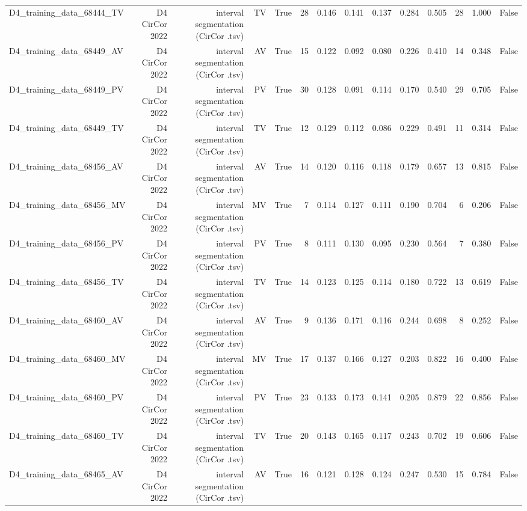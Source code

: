 \begin{table}[htbp]
\begin{tabular}{lrrrrrrrrrrrrr}
    D4\_training\_data\_68444\_TV & D4 CirCor 2022 & interval segmentation (CirCor .tsv) & TV & True & 28 & 0.146 & 0.141 & 0.137 & 0.284 & 0.505 & 28 & 1.000 & False \\
    D4\_training\_data\_68449\_AV & D4 CirCor 2022 & interval segmentation (CirCor .tsv) & AV & True & 15 & 0.122 & 0.092 & 0.080 & 0.226 & 0.410 & 14 & 0.348 & False \\
    D4\_training\_data\_68449\_PV & D4 CirCor 2022 & interval segmentation (CirCor .tsv) & PV & True & 30 & 0.128 & 0.091 & 0.114 & 0.170 & 0.540 & 29 & 0.705 & False \\
    D4\_training\_data\_68449\_TV & D4 CirCor 2022 & interval segmentation (CirCor .tsv) & TV & True & 12 & 0.129 & 0.112 & 0.086 & 0.229 & 0.491 & 11 & 0.314 & False \\
    D4\_training\_data\_68456\_AV & D4 CirCor 2022 & interval segmentation (CirCor .tsv) & AV & True & 14 & 0.120 & 0.116 & 0.118 & 0.179 & 0.657 & 13 & 0.815 & False \\
    D4\_training\_data\_68456\_MV & D4 CirCor 2022 & interval segmentation (CirCor .tsv) & MV & True & 7 & 0.114 & 0.127 & 0.111 & 0.190 & 0.704 & 6 & 0.206 & False \\
    D4\_training\_data\_68456\_PV & D4 CirCor 2022 & interval segmentation (CirCor .tsv) & PV & True & 8 & 0.111 & 0.130 & 0.095 & 0.230 & 0.564 & 7 & 0.380 & False \\
    D4\_training\_data\_68456\_TV & D4 CirCor 2022 & interval segmentation (CirCor .tsv) & TV & True & 14 & 0.123 & 0.125 & 0.114 & 0.180 & 0.722 & 13 & 0.619 & False \\
    D4\_training\_data\_68460\_AV & D4 CirCor 2022 & interval segmentation (CirCor .tsv) & AV & True & 9 & 0.136 & 0.171 & 0.116 & 0.244 & 0.698 & 8 & 0.252 & False \\
    D4\_training\_data\_68460\_MV & D4 CirCor 2022 & interval segmentation (CirCor .tsv) & MV & True & 17 & 0.137 & 0.166 & 0.127 & 0.203 & 0.822 & 16 & 0.400 & False \\
    D4\_training\_data\_68460\_PV & D4 CirCor 2022 & interval segmentation (CirCor .tsv) & PV & True & 23 & 0.133 & 0.173 & 0.141 & 0.205 & 0.879 & 22 & 0.856 & False \\
    D4\_training\_data\_68460\_TV & D4 CirCor 2022 & interval segmentation (CirCor .tsv) & TV & True & 20 & 0.143 & 0.165 & 0.117 & 0.243 & 0.702 & 19 & 0.606 & False \\
    D4\_training\_data\_68465\_AV & D4 CirCor 2022 & interval segmentation (CirCor .tsv) & AV & True & 16 & 0.121 & 0.128 & 0.124 & 0.247 & 0.530 & 15 & 0.784 & False \\

\end{tabular}
\end{table}
